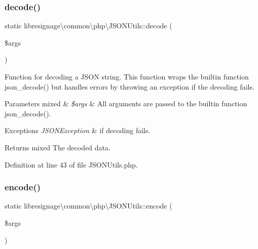 \subsubsection{\texorpdfstring{decode()}{decode()}}
{\footnotesize\ttfamily static libresignage\textbackslash{}common\textbackslash{}php\textbackslash{}\+J\+S\+O\+N\+Utils\+::decode (\begin{DoxyParamCaption}\item[{}]{\$args }\end{DoxyParamCaption})\hspace{0.3cm}{\ttfamily [static]}}

Function for decoding a J\+S\+ON string. This function wraps the builtin function json\+\_\+decode() but handles errors by throwing an exception if the decoding fails.


\begin{DoxyParams}[1]{Parameters}
mixed & {\em \$args} & All arguments are passed to the builtin function json\+\_\+decode(). \\
\hline
\end{DoxyParams}

\begin{DoxyExceptions}{Exceptions}
{\em J\+S\+O\+N\+Exception} & if decoding fails. \\
\hline
\end{DoxyExceptions}
\begin{DoxyReturn}{Returns}
mixed The decoded data. 
\end{DoxyReturn}


Definition at line 43 of file J\+S\+O\+N\+Utils.\+php.

\mbox{\label{classlibresignage_1_1common_1_1php_1_1JSONUtils_afba0c427cdb9c845a0090fe345e389b3}} 
\subsubsection{\texorpdfstring{encode()}{encode()}}
{\footnotesize\ttfamily static libresignage\textbackslash{}common\textbackslash{}php\textbackslash{}\+J\+S\+O\+N\+Utils\+::encode (\begin{DoxyParamCaption}\item[{}]{\$args }\end{DoxyParamCaption})\hspace{0.3cm}{\ttfamily [static]}}

